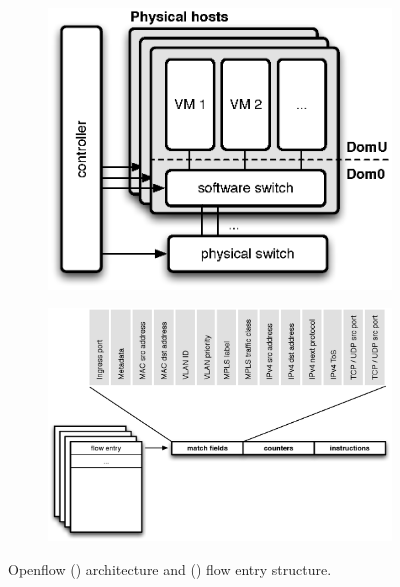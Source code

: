 \begin{figure}
    \centering
    \begin{subfigure}[b]{0.5\linewidth}
    \includegraphics[width=0.9\linewidth]{figures/inflex/ofparch}
    \caption{\label{fig:ofparch}}
    \end{subfigure}%
    \begin{subfigure}[b]{0.5\linewidth}
    \includegraphics[width=0.9\linewidth]{figures/inflex/ofptable}
    \caption{\label{fig:ofptable}}
    \end{subfigure}
    \caption{Openflow () architecture and () flow entry structure.}
\end{figure}

